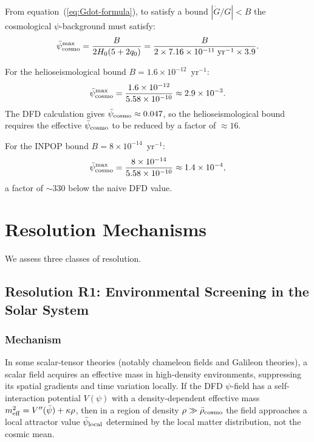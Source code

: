 \documentclass[aps,prd,twocolumn,superscriptaddress,nofootinbib,longbibliography]{revtex4-2}
\newcommand{\psibar}{\bar{\psi}}
\newcommand{\ee}[1]{\times 10^{#1}}
\begin{document}
From equation~(\ref{eq:Gdot-formula}), to satisfy a bound $|\dot{G}/G| < B$
the cosmological $\psi$-background must satisfy:
\begin{equation}
\psibar_{\rm cosmo}^{\rm max} = \frac{B}{2H_0(5+2q_0)}
= \frac{B}{2 \times 7.16\ee{-11}\;\text{yr}^{-1} \times 3.9}.
\label{eq:psibar-max}
\end{equation}

For the helioseismological bound $B = 1.6\ee{-12}$~yr$^{-1}$:
\begin{equation}
\psibar_{\rm cosmo}^{\rm max} = \frac{1.6\ee{-12}}{5.58\ee{-10}} \approx 2.9\ee{-3}.
\label{eq:psibar-max-helio}
\end{equation}
The DFD calculation gives $\psibar_{\rm cosmo} \approx 0.047$, so the
helioseismological bound requires the effective $\psibar_{\rm cosmo}$ to be
reduced by a factor of $\approx 16$.

For the INPOP bound $B = 8\ee{-14}$~yr$^{-1}$:
\begin{equation}
\psibar_{\rm cosmo}^{\rm max} = \frac{8\ee{-14}}{5.58\ee{-10}} \approx 1.4\ee{-4},
\label{eq:psibar-max-inpop}
\end{equation}
a factor of $\sim\!330$ below the naive DFD value.

\section{Resolution Mechanisms}
\label{sec:resolution}

We assess three classes of resolution.

\subsection{Resolution R1: Environmental Screening in the Solar System}
\label{sec:R1}

\subsubsection{Mechanism}

In some scalar-tensor theories (notably chameleon fields and Galileon
theories), a scalar field acquires an effective mass in high-density
environments, suppressing its spatial gradients and time variation locally.
If the DFD $\psi$-field has a self-interaction potential $V(\psi)$ with
a density-dependent effective mass $m_{\rm eff}^2 = V''(\psibar) + \kappa\rho$,
then in a region of density $\rho \gg \bar{\rho}_{\rm cosmo}$ the field
approaches a local attractor value $\psibar_{\rm local}$ determined by the
local matter distribution, not the cosmic mean.
\end{document}

